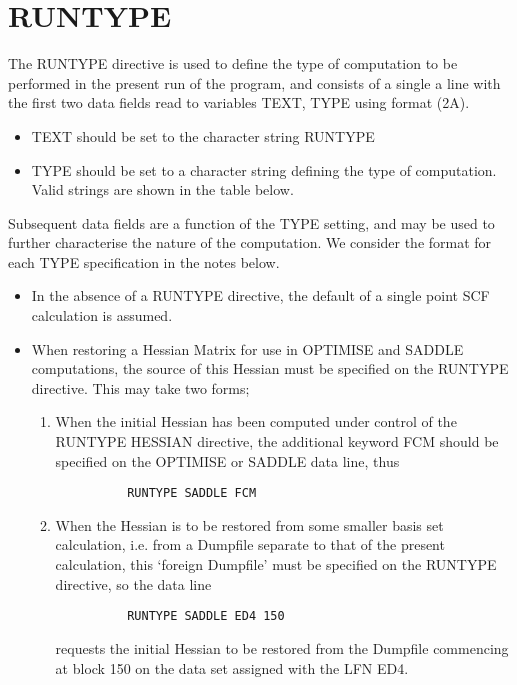\documentclass[11pt,fleqn]{article}
\begin{document}
\section[RUNTYPE]{RUNTYPE}

The RUNTYPE directive is used to define the type of computation to be 
performed in the present run of the program, and consists of a single
a line with the first two data fields read to variables 
TEXT, TYPE using format (2A).
\begin{itemize}
\item TEXT should be set to the character string RUNTYPE
\item TYPE should be set to a character string defining the 
type of computation. Valid strings are shown in the table below.
\end{itemize}
Subsequent data fields are a function of the TYPE setting, and may
be used to further characterise the nature of the computation. We 
consider the format for each TYPE specification in the notes below.

\begin{itemize}
\item  In the absence of a RUNTYPE directive, the default of a single point
SCF calculation is assumed.
\item  When restoring a Hessian Matrix for use in OPTIMISE and
SADDLE computations, the source of this Hessian must
be specified on the RUNTYPE directive. This may take two
forms;
\begin{enumerate}
\item When the initial Hessian has been computed under control
of the RUNTYPE HESSIAN directive, the additional keyword FCM
should be specified on the OPTIMISE or SADDLE data line, thus

{
\footnotesize
\begin{verbatim}
          RUNTYPE SADDLE FCM
\end{verbatim}
}
\item When the Hessian is to be restored from some
smaller basis set calculation, i.e. from a Dumpfile separate to
that of the present calculation, this `foreign Dumpfile'  must be
specified on the RUNTYPE directive, so the data line

{
\footnotesize
\begin{verbatim}
          RUNTYPE SADDLE ED4 150
\end{verbatim}
}

requests the initial Hessian to be restored from the Dumpfile
commencing at block 150 on the data set assigned with the LFN ED4.
\end{enumerate}
\end{itemize}
\end{document}
